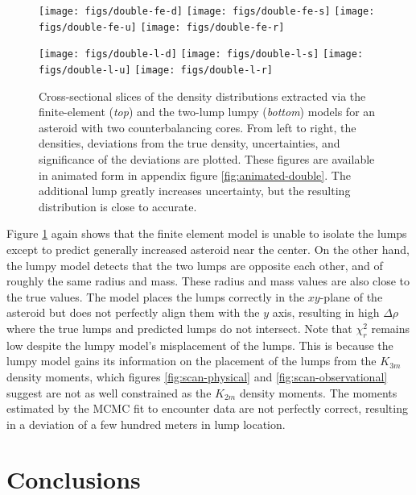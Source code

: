 \documentclass[fleqn,usenatbib]{mnras}
\begin{document}
\begin{figure}
  \texttt{[image: figs/double-fe-d]}\hfill
  \texttt{[image: figs/double-fe-s]}\hfill
  \texttt{[image: figs/double-fe-u]}\hfill
  \texttt{[image: figs/double-fe-r]}

  \texttt{[image: figs/double-l-d]}\hfill
  \texttt{[image: figs/double-l-s]}\hfill
  \texttt{[image: figs/double-l-u]}\hfill
  \texttt{[image: figs/double-l-r]}

  \caption{Cross-sectional slices of the density distributions extracted via the finite-element (\textit{top}) and the two-lump lumpy (\textit{bottom}) models for an asteroid with two counterbalancing cores. From left to right, the densities, deviations from the true density, uncertainties, and significance of the deviations are plotted. These figures are available in animated form in appendix figure \ref{fig:animated-double}. The additional lump greatly increases uncertainty, but the resulting distribution is close to accurate.}
  \label{fig:den-double}
\end{figure}

Figure \ref{fig:den-double} again shows that the finite element model is unable to isolate the lumps except to predict generally increased asteroid near the center. On the other hand, the lumpy model detects that the two lumps are opposite each other, and of roughly the same radius and mass. These radius and mass values are also close to the true values. The model places the lumps correctly in the $xy$-plane of the asteroid but does not perfectly align them with the $y$ axis, resulting in high $\Delta \rho$ where the true lumps and predicted lumps do not intersect. Note that $\chi^2_r$ remains low despite the lumpy model's misplacement of the lumps. This is because the lumpy model gains its information on the placement of the lumps from the $K_{3m}$ density moments, which figures \ref{fig:scan-physical} and \ref{fig:scan-observational} suggest are not as well constrained as the $K_{2m}$ density moments. The moments estimated by the MCMC fit to encounter data are not perfectly correct, resulting in a deviation of a few hundred meters in lump location.


\section{Conclusions}
\end{document}
